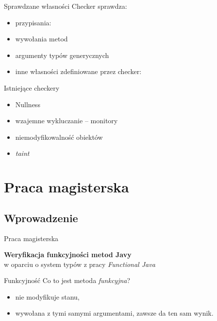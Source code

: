 \documentclass{beamer}
\begin{document}
\begin{frame}{Sprawdzane własności}
  Checker sprawdza:
  \begin{itemize}
  \item<1-> przypisania:
    
  \item<2-> wywołania metod
  \item<2-> argumenty typów generycznych
  \item<3-> inne własności zdefiniowane przez checker:
    
  \end{itemize}
\end{frame}

\begin{frame}{Istniejące checkery}
\begin{itemize}
\item<1-> Nullness
\item<2-> wzajemne wykluczanie -- monitory
\item<3-> niemodyfikowalność obiektów
\item<4-> \emph{taint}
\end{itemize}
\end{frame}

\section{Praca magisterska}

\subsection{Wprowadzenie}

\begin{frame}{Praca magisterska}
\begin{center}
  \textbf{Weryfikacja funkcyjności metod Javy}\\
  w oparciu o system typów z pracy \emph{Functional Java}
\end{center}
\end{frame}

\begin{frame}{Funkcyjność}
  Co to jest metoda \emph{funkcyjna}?
  \begin{itemize}
  \item<1-> nie modyfikuje stanu,
  \item<2-> wywołana z tymi samymi argumentami, zawsze da ten sam wynik.
  \end{itemize}
\end{frame}
\end{document}
